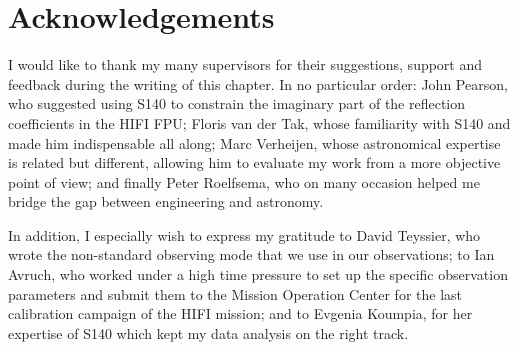 \section*{Acknowledgements}
I would like to thank my many supervisors for their suggestions, support and feedback during the writing of this chapter.
In no particular order:
John Pearson, who suggested using S140 to constrain the imaginary part of the reflection coefficients in the HIFI FPU;
Floris van der Tak, whose familiarity with S140 and \radex{} made him indispensable all along;
Marc Verheijen, whose astronomical expertise is related but different, allowing him to evaluate my work from a more objective point of view;
and finally Peter Roelfsema, who on many occasion helped me bridge the gap between engineering and astronomy.

In addition, I especially wish to express my gratitude to David Teyssier, who wrote the non-standard observing mode that we use in our observations;
to Ian Avruch, who worked under a high time pressure to set up the specific observation parameters and submit them to the Mission Operation Center for the last calibration campaign of the HIFI mission;
and to Evgenia Koumpia, for her expertise of S140 which kept my data analysis on the right track.
